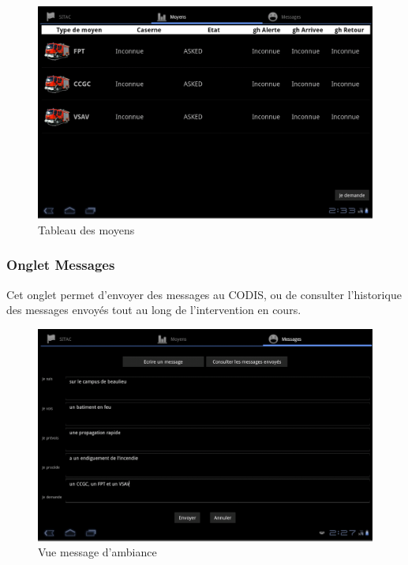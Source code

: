 \documentclass{article}
\begin{document}
\vspace{1.1in}

\begin{figure}[hbt]
\begin{center}
\includegraphics[width=470pt]{Manueldutilisation-fig002.png}
\caption{Tableau des moyens}
\end{center}
\end{figure}

\newpage
\subsubsection{Onglet Messages}

Cet onglet permet d’envoyer des messages au CODIS, ou de consulter l’historique des messages envoyés tout au long de l’intervention en cours.

\vspace{1.2in}

\begin{figure}[h!]
\begin{center}
\includegraphics[width=450pt]{Manueldutilisation-fig003.png}
\caption{Vue message d'ambiance}
\end{center}
\end{figure}
\end{document}
